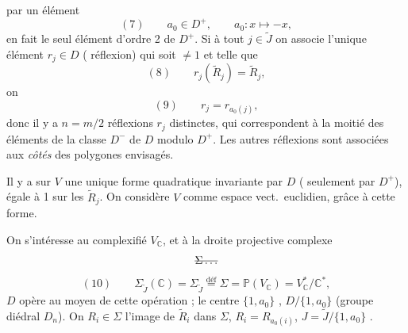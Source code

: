 \documentclass[11pt,a4paper]{article}
\begin{document}
   par un élément  
\[
  (7)\qquad a_0 \in D^{+}, \qquad a_0 : x \longmapsto -x ,
\]
 en fait le seul élément d'ordre 2 de $D^{+}$. Si à tout
$j \in \tilde{J}$ on associe l'unique  élément
$r_j \in D$ ( réflexion)  qui soit
$\neq 1$ et telle que
\[
  (8)\qquad r_j(\tilde{R}_j) = \tilde{R}_j ,
\]
on 
\[
  (9)\qquad r_j = r_{a_0(j)} ,
\]
 donc il y a  $n = m/2$ réflexions $r_j$
distinctes, qui correspondent à la moitié  des
éléments de la classe $D^{-}$ de $D$ modulo $D^{+}$. Les autres réflexions
sont  associées aux \emph{côtés} des polygones envisagés.

Il y a sur $V$ une unique forme quadratique invariante par $D$ (\ill{}
seulement par $D^{+}$),  égale à 1 sur les $\tilde{R}_j$.
On considère $V$ comme espace vect.\ euclidien, grâce à cette forme.



On s'intéresse au complexifié $V_{\mathbb{C}}$, et à la droite projective
complexe
\[
  \text{\struck{$\Sigma \ldots$}}
\]
\[
  (10)\qquad \Sigma_{\tilde{J}}(\mathbb{C}) = \Sigma_{\tilde{J}}
  \overset{\text{déf}}{=} \Sigma = \mathbb{P}(V_{\mathbb{C}})
  = V_{\mathbb{C}}^{*}/\mathbb{C}^{*} ,
\]
  $D$ opère \struck{\ill{}} au moyen de cette
opération ; le centre $\{1, a_0\}$ , \ill{}
$D/\{1, a_0\}$ (groupe diédral $D_n$). On  $R_i \in \Sigma$
l'image de $\tilde{R}_i$ dans $\Sigma$, \ill{}
$R_i = R_{a_0(i)}$, \ill{} $J = \tilde{J}/\{1, a_0\}$ \ill{}.
\end{document}

